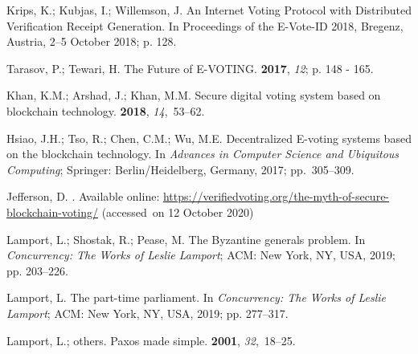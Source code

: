 \documentclass[applsci,article,accept,moreauthors,pdftex]{Definitions/mdpi}
\begin{document}
\begin{thebibliography}{999}
Krips, K.; Kubjas, I.; Willemson, J.
\newblock An Internet Voting Protocol with Distributed Verification Receipt
  Generation. In Proceedings of the  E-Vote-ID 2018, { Bregenz, Austria, 2--5 October 2018}; p. 128.%

Tarasov, P.; Tewari, H.
\newblock The Future of E-VOTING.
 {\bf 2017}, {{\em 12}; p. 148 - 165}.%

Khan, K.M.; Arshad, J.; Khan, M.M.
\newblock Secure digital voting system based on blockchain technology.
  {\bf 2018}, {\em 14},~53--62.

Hsiao, J.H.; Tso, R.; Chen, C.M.; Wu, M.E.
\newblock Decentralized E-voting systems based on the blockchain technology. In
  {\em Advances in Computer Science and Ubiquitous Computing}; Springer:  {Berlin/Heidelberg, Germany,} %
  2017;
  pp.~305--309.

Jefferson, D.
.
Available online:   
\url{https://verifiedvoting.org/the-myth-of-secure-blockchain-voting/}
\newblock (accessed~on 12 October 2020)

Lamport, L.; Shostak, R.; Pease, M.
\newblock The Byzantine generals problem. In {\em Concurrency: The Works of
  Leslie Lamport};  ACM:  {New York, NY, USA,} %
2019; pp. 203--226.


Lamport, L.
\newblock The part-time parliament. In {\em Concurrency: The Works of Leslie
  Lamport}; ACM:   {New York, NY, USA,} 2019; pp. 277--317.

Lamport, L.; others.
\newblock Paxos made simple.
 {\bf 2001}, {\em 32},~18--25.


\end{thebibliography}
\end{document}
